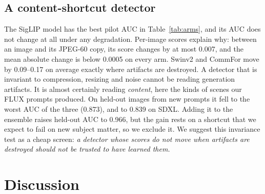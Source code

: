 \documentclass[conference]{IEEEtran}
\begin{document}
\subsection{A content-shortcut detector}
\label{sec:siglip}
The SigLIP model has the best pilot AUC in Table~\ref{tab:arms}, and its AUC
does not change at all under any degradation. Per-image scores explain why:
between an image and its JPEG-60 copy, its score changes by at most 0.007,
and the mean absolute change is below 0.0005 on every arm. Swinv2 and
CommFor move by 0.09--0.17 on average exactly where artifacts are destroyed.
A detector that is invariant to compression, resizing and noise cannot be
reading generation artifacts. It is almost certainly reading \emph{content},
here the kinds of scenes our FLUX prompts produced. On held-out images from
new prompts it fell to the worst AUC of the three (0.873), and to 0.839 on
SDXL. Adding it to the ensemble raises held-out AUC to 0.966, but the gain
rests on a shortcut that we expect to fail on new subject matter, so we
exclude it. We suggest this invariance test as a cheap screen: \emph{a
detector whose scores do not move when artifacts are destroyed should not
be trusted to have learned them.}

\section{Discussion}
\label{sec:discussion}
\end{document}
